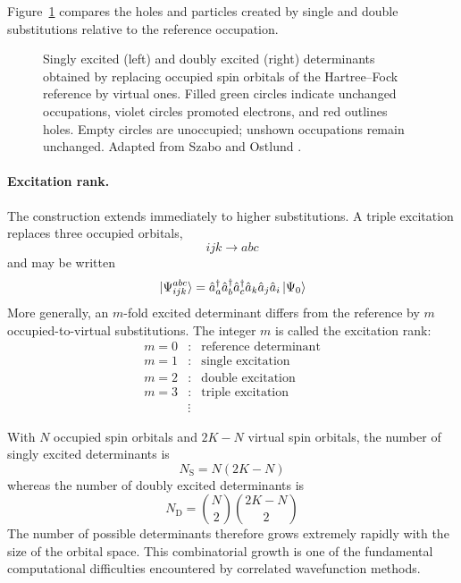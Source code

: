 \documentclass[11pt,a4paper,titlepage]{article}
\numberwithin{equation}{section}
\newcommand{\cre}[1]{\Hat{a}_{#1}^\dag}
\newcommand{\ani}[1]{\Hat{a}_{#1}}
\begin{document}
Figure~\ref{fig:excited-determinants} compares the holes and particles created
by single and double substitutions relative to the reference occupation.
\begin{figure}[htbp]
  \centering
  
  \caption{Singly excited (left) and doubly excited (right) determinants
  obtained by replacing occupied spin orbitals of the Hartree--Fock
  reference by virtual ones. Filled green circles indicate unchanged
  occupations, violet circles promoted electrons, and red outlines holes.
  Empty circles are unoccupied; unshown occupations remain unchanged.
  Adapted from Szabo and Ostlund \citep{SzaboOstlund1996}.}
  \label{fig:excited-determinants}
\end{figure}


\paragraph{Excitation rank.}

The construction extends immediately to higher substitutions. A triple
excitation replaces three occupied orbitals,
\begin{equation}
  ijk\longrightarrow abc
\end{equation}
and may be written
\begin{equation}
  \ket*{\Psi_{ijk}^{abc}}
  =
  \cre{a}\cre{b}\cre{c}
  \ani{k}\ani{j}\ani{i}
  \ket{\Psi_0}
\end{equation}
More generally, an $m$-fold excited determinant differs from the reference
by $m$ occupied-to-virtual substitutions. The integer $m$ is called the
excitation rank:
\begin{equation}
  \begin{array}{ccl}
    m=0 &:& \text{reference determinant}\\
    m=1 &:& \text{single excitation}\\
    m=2 &:& \text{double excitation}\\
    m=3 &:& \text{triple excitation}\\
    &\vdots&
  \end{array}
\end{equation}

With $N$ occupied spin orbitals and $2K-N$ virtual spin orbitals, the number
of singly excited determinants is
\begin{equation}
  N_\text{S}
  =
  N(2K-N)
\end{equation}
whereas the number of doubly excited determinants is
\begin{equation}
  N_\text{D}
  =
  \binom{N}{2}
  \binom{2K-N}{2}
\end{equation}
The number of possible determinants therefore grows extremely rapidly with
the size of the orbital space. This combinatorial growth is one of the
fundamental computational difficulties encountered by correlated
wavefunction methods.
\end{document}
